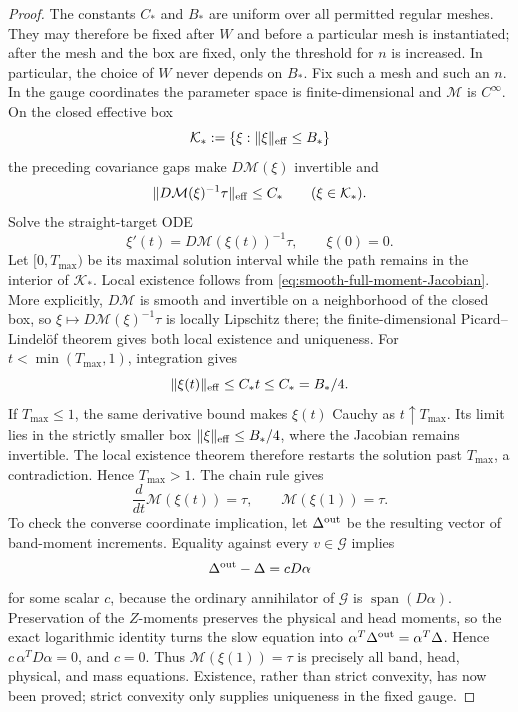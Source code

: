 \documentclass[11pt]{article}
\numberwithin{equation}{section}
\theoremstyle{definition}
\theoremstyle{remark}
\newcommand{\1}{\mathbf 1}
\begin{document}
\begin{proof}
The constants \(C_*\) and \(B_*\) are uniform over all permitted regular
meshes.  They may therefore be fixed after \(W\) and before a particular
mesh is instantiated; after the mesh and the box are fixed, only the
threshold for \(n\) is increased.  In particular, the choice of \(W\)
never depends on \(B_*\).  Fix such a mesh and such an \(n\).  In the
gauge coordinates the parameter
space is finite-dimensional and \(\mathcal M\) is \(C^\infty\).  On the
closed effective box
\[
 \mathcal K_*:=\{\xi:\|\xi\|_{\rm eff}\leq B_*\}
\]
the preceding covariance gaps make \(D\mathcal M(\xi)\) invertible and
\[
 \|D\mathcal M(\xi)^{-1}\tau\|_{\rm eff}\leq C_*
 \qquad(\xi\in\mathcal K_*).
\]
Solve the straight-target ODE
\begin{equation}
 \xi'(t)=D\mathcal M(\xi(t))^{-1}\tau,\qquad
                         \xi(0)=0.
 \label{eq:smooth-moment-map-ODE}
\end{equation}
Let \([0,T_{\max})\) be its maximal solution interval while the path
remains in the interior of \(\mathcal K_*\).  Local existence follows
from \eqref{eq:smooth-full-moment-Jacobian}.  More explicitly,
\(D\mathcal M\) is smooth and invertible on a neighborhood of the
closed box, so
\(\xi\mapsto D\mathcal M(\xi)^{-1}\tau\) is locally Lipschitz there;
the finite-dimensional Picard--Lindelöf theorem gives both local
existence and uniqueness.  For
\(t<\min(T_{\max},1)\), integration gives
\[
 \|\xi(t)\|_{\rm eff}\leq C_*t\leq C_*=B_*/4.
\]
If \(T_{\max}\leq1\), the same derivative bound makes \(\xi(t)\)
Cauchy as \(t\uparrow T_{\max}\).  Its limit lies in the strictly
smaller box \(\|\xi\|_{\rm eff}\leq B_*/4\), where the Jacobian remains
invertible.  The local existence theorem therefore restarts the
solution past \(T_{\max}\), a contradiction.  Hence \(T_{\max}>1\).
The chain rule gives
\[
 \frac d{dt}\mathcal M(\xi(t))=\tau,
 \qquad \mathcal M(\xi(1))=\tau.
\]
To check the converse coordinate
implication, let \(\Delta^{\rm out}\) be the resulting vector of band-moment
increments.  Equality against every \(v\in\mathcal G\) implies
\[
 \Delta^{\rm out}-\Delta=cD\alpha
\]
for some scalar \(c\), because the ordinary annihilator of
\(\mathcal G\) is \(\operatorname{span}(D\alpha)\).  Preservation of
the \(Z\)-moments preserves the physical and head moments, so the exact
logarithmic identity turns the slow equation into
\(\alpha^T\Delta^{\rm out}=\alpha^T\Delta\).  Hence
\(c\,\alpha^TD\alpha=0\), and \(c=0\).  Thus
\(\mathcal M(\xi(1))=\tau\) is precisely all band, head, physical, and
mass equations.  Existence, rather than strict convexity, has now
been proved; strict convexity only supplies uniqueness in the fixed
gauge.


\end{proof}
\end{document}
